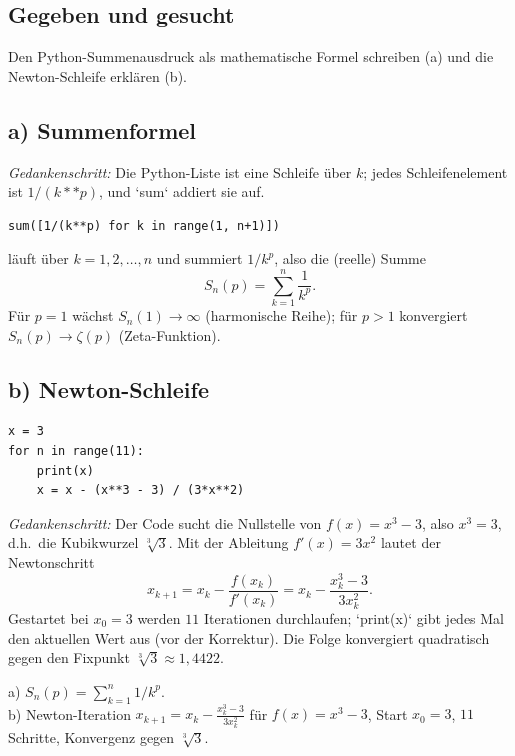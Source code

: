
\subsection*{Gegeben und gesucht}
Den Python-Summenausdruck als mathematische Formel schreiben (a) und die
Newton-Schleife erklären (b).

\subsection*{a) Summenformel}
\emph{Gedankenschritt:} Die Python-Liste ist eine Schleife über $k$; jedes
Schleifenelement ist $1/(k**p)$, und `sum` addiert sie auf.
\begin{verbatim}
sum([1/(k**p) for k in range(1, n+1)])
\end{verbatim}
läuft über $k=1,2,\ldots,n$ und summiert $1/k^p$, also die (reelle)
Summe
\begin{equation*}
  S_n(p)=\sum_{k=1}^{n}\frac{1}{k^p}.
\end{equation*}
Für $p=1$ wächst $S_n(1)\to\infty$ (harmonische Reihe); für $p>1$
konvergiert $S_n(p)\to\zeta(p)$ (Zeta-Funktion).

\subsection*{b) Newton-Schleife}
\begin{verbatim}
x = 3
for n in range(11):
    print(x)
    x = x - (x**3 - 3) / (3*x**2)
\end{verbatim}
\emph{Gedankenschritt:} Der Code sucht die Nullstelle von $f(x)=x^3-3$,
also $x^3=3$, d.h.\ die Kubikwurzel $\sqrt[3]{3}$. Mit der Ableitung
$f'(x)=3x^2$ lautet der Newtonschritt
\begin{equation*}
  x_{k+1}=x_k-\frac{f(x_k)}{f'(x_k)}
  =x_k-\frac{x_k^3-3}{3x_k^2}.
\end{equation*}
Gestartet bei $x_0=3$ werden $11$ Iterationen durchlaufen; `print(x)`
gibt jedes Mal den aktuellen Wert aus (vor der Korrektur). Die Folge
konvergiert quadratisch gegen den Fixpunkt $\sqrt[3]{3}\approx1{,}4422$.

\begin{ergebnis}
a) $S_n(p)=\sum_{k=1}^{n}1/k^p$.\\
b) Newton-Iteration $x_{k+1}=x_k-\frac{x_k^3-3}{3x_k^2}$ für
$f(x)=x^3-3$, Start $x_0=3$, $11$ Schritte, Konvergenz gegen $\sqrt[3]{3}$.
\end{ergebnis}

